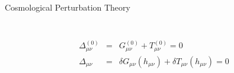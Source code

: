 \documentclass[8pt,aspectratio=1610]{beamer}
\begin{document}
\begin{frame}{Cosmological Perturbation Theory}
\begin{columns}
\begin{column}{0.3\linewidth}
\begin{figure}[t]
			\end{figure}
		\end{column}
	\end{columns}
		\begin{eqnarray}
		\Delta_{\mu\nu}^{(0)} &=& G_{\mu\nu}^{(0)} + T_{\mu\nu}^{(0)} =0
		\\
		\Delta_{\mu\nu} &=& \delta G_{\mu\nu}(h_{\mu\nu}) + \delta T_{\mu\nu}(h_{\mu\nu})=0
		\end{eqnarray}
		\let\thefootnote\relax{}
\end{frame}

\end{document}
